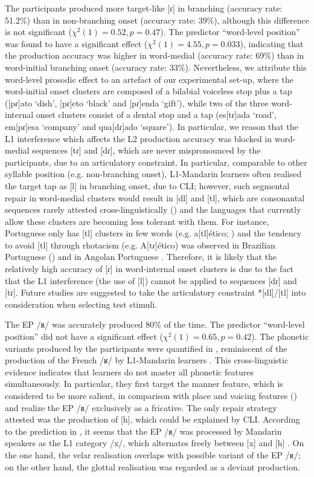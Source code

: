 \documentclass[output=paper]{../langscibook}
\begin{document}
The participants produced more target-like [ɾ] in branching (accuracy rate: 51.2\%) than in non-branching onset (accuracy rate: 39\%), although this difference is not significant ($\chi^2(1) = 0.52, p=0.47$). The predictor “word-level position” was found to have a significant effect ($\chi^2(1) = 4.55, p=0.033$), indicating that the production accuracy was higher in word-medial (accuracy rate: 69\%) than in word-initial branching onset (accuracy rate: 33\%). Nevertheless, we attribute this word-level prosodic effect to an artefact of our experimental set-up, where the word-initial onset clusters are composed of a bilabial voiceless stop plus a tap ([pɾ]ato `dish', [pɾ]eto `black' and [pɾ]enda `gift'), while two of the three word-internal onset clusters consist of a dental stop and a tap (es[tɾ]ada `road', em[pɾ]esa `company' and qua[dɾ]ado `square'). In particular, we reason that the L1 interference which affects the L2 production accuracy was blocked in word-medial sequences [tɾ] and [dɾ], which are never mispronounced by the participants, due to an articulatory constraint. In particular, comparable to other syllable position (e.g. non-branching onset), L1-Mandarin learners often realised the target tap as [l] in branching onset, due to CLI; however, such segmental repair in word-medial clusters would result in [dl] and [tl], which are consonantal sequences rarely attested cross-linguistically (\citealt{HalleBest2007}) and the languages that currently allow these clusters are becoming less tolerant with them. For instance, Portuguese only has [tl] clusters in few words (e.g. a[tl]ético; \citealt{MateusAndrade2000}) and the tendency to avoid [tl] through rhotacism (e.g. A[tɾ]ético) was observed in Brazilian Portuguese (\citealt{Cristofaro-Silva2003}) and in Angolan Portuguese \citep{Miguel2018}. Therefore, it is likely that the relatively high accuracy of [ɾ] in word-internal onset clusters is due to the fact that the L1 interference (the use of [l]) cannot be applied to sequences [dɾ] and [tɾ]. Future studies are suggested to take the articulatory constraint *[dl]/[tl] into consideration when selecting test stimuli.

The EP /ʀ/ was accurately produced 80\% of the time. The predictor “word-level position” did not have a significant effect ($\chi^2(1) = 0.65, p=0.42$). The phonetic variants produced by the participants were quantified in , reminiscent of the production of the French /ʁ/ by L1-Mandarin learners \citep{Steele2002}. This cross-linguistic evidence indicates that learners do not master all phonetic features simultaneously. In particular, they first target the manner feature, which is considered to be more salient, in comparison with place and voicing features (\citealt{ColantoniSteele2008}) and realize the EP /ʀ/ exclusively as a fricative. The only repair strategy attested was the production of [h], which could be explained by CLI. According to the prediction in , it seems that the EP /ʀ/ was processed by Mandarin speakers as the L1 category /x/, which alternates freely between [x] and [h] \citep{Lin2007}. On the one hand, the velar realisation overlaps with possible variant of the EP /ʀ/; on the other hand, the glottal realisation was regarded as a deviant production.
\end{document}
